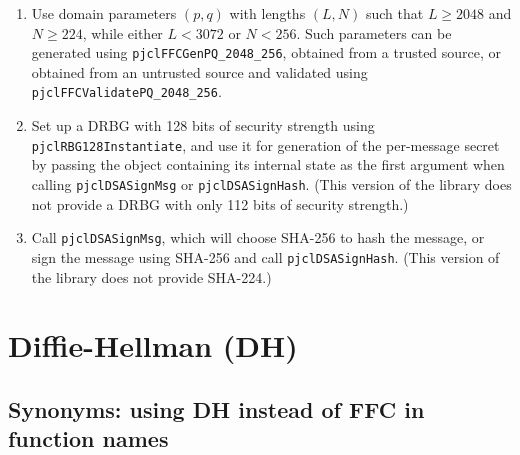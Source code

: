 \documentclass[12pt]{article}
\begin{document}
\begin{enumerate}

\item Use domain parameters
$(p,q)$ with lengths $(L,N)$ such that $L \geq 2048$ and $N \geq 224$,
while either $L < 3072$ or $N < 256$.
Such parameters can be generated using {\tt pjclFFCGenPQ\_2048\_256},
obtained from a trusted source, or obtained from an untrusted source
and validated using {\tt pjclFFCValidatePQ\_2048\_256}.

\item Set up a DRBG with 128 bits of security strength using 
{\tt pjclRBG128Instantiate}, and use it for generation of the
per-message secret by passing the object containing its internal state
as the first argument when calling {\tt pjclDSASignMsg} or
{\tt pjclDSASignHash}.  (This version of the library does not provide
a DRBG with only 112 bits of security strength.)

\item Call {\tt pjclDSASignMsg}, which will choose SHA-256 to 
hash the message, or sign the message using SHA-256 and call
{\tt pjclDSASignHash}.  (This version of the library does not
provide SHA-224.)

\end{enumerate}

\section{Diffie-Hellman (DH)}

\subsection{Synonyms: using DH instead of FFC in function names}
\end{document}
